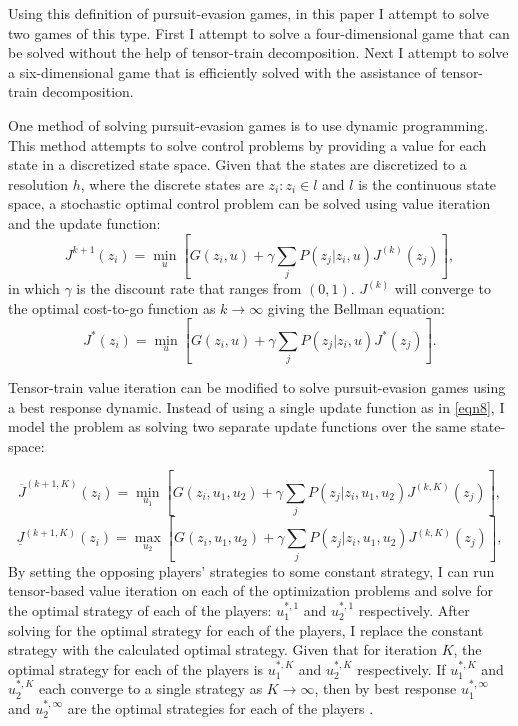 Using this definition of pursuit-evasion games, in this paper I attempt to solve two games of this type. First I attempt to solve a four-dimensional game that can be solved without the help of tensor-train decomposition. Next I attempt to solve a six-dimensional game that is efficiently solved with the assistance of tensor-train decomposition.

One method of solving pursuit-evasion games is to use dynamic programming. This method attempts to solve control problems by providing a value for each state in a discretized state space. Given that the states are discretized to a resolution $h$, where the discrete states are ${z_i:z_i \in l}$ and $l$ is the continuous state space, a stochastic optimal control problem can be solved using value iteration and the update function:
\begin{equation}\label{eqn8}
J^{k+1}(z_i)= \underset{u }{\operatorname{min }}[G(z_i,u) + \gamma \sum_{j}P(z_j|z_i, u)J^{(k)}(z_j)],
\end{equation}
in which $\gamma$ is the discount rate that ranges from $(0,1)$. $J^{(k)}$ will converge to the optimal cost-to-go function as $k \rightarrow \infty$ giving the Bellman equation:
\begin{equation*}
J^*(z_i) = \underset{u }{\operatorname{min }}[G(z_i,u) + \gamma \sum_{j}P(z_j|z_i,u)J^*(z_j)].
\end{equation*}  


Tensor-train value iteration can be modified to solve pursuit-evasion games using a best response dynamic. Instead of using a single update function as in \ref{eqn8}, I model the problem as solving two separate update functions over the same state-space:

\begin{equation}\label{eqn10}
\overline{J}^{(k+1,K)}(z_i)= \underset{u_1 }{\operatorname{min }}[G(z_i,u_1,u_2)+\gamma \sum_{j} P(z_j|z_i,u_1,u_2) J^{(k,K)}(z_j)],
\end{equation}
\begin{equation}\label{eqn11}
\underline{J}^{(k+1,K)}(z_i)= \underset{u_2 }{\operatorname{max }}[G(z_i,u_1,u_2)+\gamma \sum_{j} P(z_j|z_i,u_1,u_2) J^{(k,K)}(z_j)],
\end{equation}
By setting the opposing players' strategies to some constant strategy, I can run tensor-based value iteration on each of the optimization problems and solve for the optimal strategy of each of the players: $u_{1}^{*,1}$ and $u_{2}^{*,1}$ respectively. After solving for the optimal strategy for each of the players, I replace the constant strategy with the calculated optimal strategy. Given that for iteration $K$, the optimal strategy for each of the players is $u_{1}^{*,K}$ and $u_{2}^{*,K}$ respectively. If $u_{1}^{*,K}$ and $u_{2}^{*,K}$ each converge to a single strategy as $K \rightarrow \infty$, then by best response $u_{1}^{*,\infty}$ and $u_{2}^{*,\infty}$ are the optimal strategies for each of the players \cite{fuden}.

